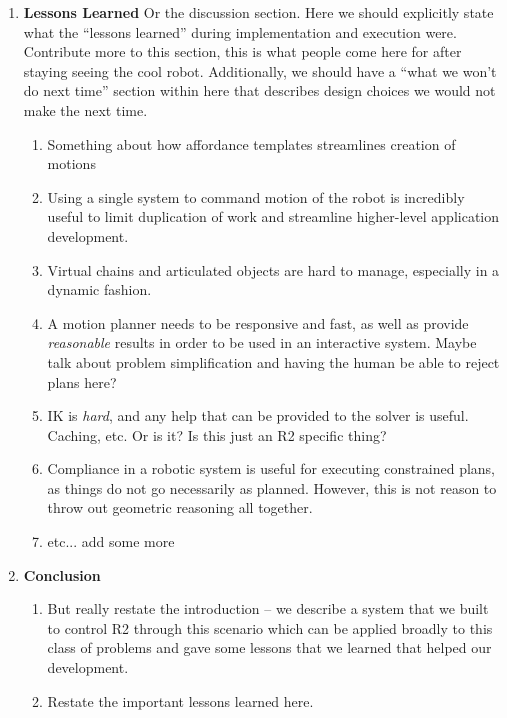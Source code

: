 \begin{enumerate}
\item \textbf{Lessons Learned}
  Or the discussion section.
  Here we should explicitly state what the ``lessons learned'' during implementation and execution were.
  Contribute more to this section, this is what people come here for after staying seeing the cool robot.
  Additionally, we should have a ``what we won't do next time'' section within here that describes design choices we would not make the next time.

  \begin{enumerate}
  \item
    Something about how affordance templates streamlines creation of motions
  \item
    Using a single system to command motion of the robot is incredibly useful to limit duplication of work and streamline higher-level application development.
  \item
    Virtual chains and articulated objects are hard to manage, especially in a dynamic fashion.
  \item
    A motion planner needs to be responsive and fast, as well as provide \emph{reasonable} results in order to be used in an interactive system.
    Maybe talk about problem simplification and having the human be able to reject plans here?
  \item
    IK is \emph{hard}, and any help that can be provided to the solver is useful. Caching, etc.
    Or is it?
    Is this just an R2 specific thing?
  \item
    Compliance in a robotic system is useful for executing constrained plans, as things do not go necessarily as planned.
    However, this is not reason to throw out geometric reasoning all together.
  \item
    etc... add some more
  \end{enumerate}

\item \textbf{Conclusion}
  \begin{enumerate}
  \item
    But really restate the introduction -- we describe a system that we built to control R2 through this scenario which can be applied broadly to this class of problems and gave some lessons that we learned that helped our development.
  \item
    Restate the important lessons learned here.
  \end{enumerate}
\end{enumerate}
